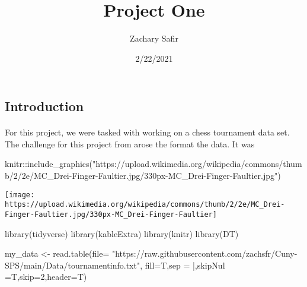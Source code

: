 \documentclass[
]{article}
\title{Project One}
\author{Zachary Safir}
\date{2/22/2021}
\newenvironment{Shaded}{\begin{snugshade}}{\end{snugshade}}
\newcommand{\AttributeTok}[1]{\textcolor[rgb]{0.77,0.63,0.00}{#1}}
\newcommand{\DecValTok}[1]{\textcolor[rgb]{0.00,0.00,0.81}{#1}}
\newcommand{\FunctionTok}[1]{\textcolor[rgb]{0.00,0.00,0.00}{#1}}
\newcommand{\NormalTok}[1]{#1}
\newcommand{\OtherTok}[1]{\textcolor[rgb]{0.56,0.35,0.01}{#1}}
\newcommand{\SpecialCharTok}[1]{\textcolor[rgb]{0.00,0.00,0.00}{#1}}
\newcommand{\StringTok}[1]{\textcolor[rgb]{0.31,0.60,0.02}{#1}}
\begin{document}
\maketitle

\newpage

\hypertarget{introduction}{%
\subsection{Introduction}\label{introduction}}

\paragraph{}

For this project, we were tasked with working on a chess tournament data
set. The challenge for this project from arose the format the data. It
was

\begin{Shaded}
\begin{Highlighting}[]
\NormalTok{knitr}\SpecialCharTok{::}\FunctionTok{include\_graphics}\NormalTok{(}\StringTok{"https://upload.wikimedia.org/wikipedia/commons/thumb/2/2e/MC\_Drei{-}Finger{-}Faultier.jpg/330px{-}MC\_Drei{-}Finger{-}Faultier.jpg"}\NormalTok{)}
\end{Highlighting}
\end{Shaded}

\texttt{[image: https://upload.wikimedia.org/wikipedia/commons/thumb/2/2e/MC\_Drei-Finger-Faultier.jpg/330px-MC\_Drei-Finger-Faultier]}

\begin{Shaded}
\begin{Highlighting}[]
\FunctionTok{library}\NormalTok{(tidyverse)}
\FunctionTok{library}\NormalTok{(kableExtra)}
\FunctionTok{library}\NormalTok{(knitr)}
\FunctionTok{library}\NormalTok{(DT)}

\NormalTok{my\_data }\OtherTok{\textless{}{-}} 
\FunctionTok{read.table}\NormalTok{(}\AttributeTok{file=} \StringTok{"https://raw.githubusercontent.com/zachsfr/Cuny{-}SPS/main/Data/tournamentinfo.txt"}\NormalTok{,}
                      \AttributeTok{fill=}\NormalTok{T,}\AttributeTok{sep =} \StringTok{\textquotesingle{}|\textquotesingle{}}\NormalTok{,}\AttributeTok{skipNul =}\NormalTok{T,}\AttributeTok{skip=}\DecValTok{2}\NormalTok{,}\AttributeTok{header=}\NormalTok{T)}
\end{Highlighting}
\end{Shaded}
\end{document}
